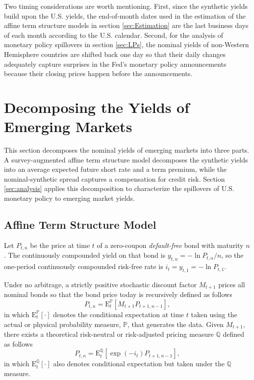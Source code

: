 \documentclass[a4paper, 12pt]{article}
\providecommand{\tnr}{n}
\providecommand{\idxt}{t}
\providecommand{\idxs}{\idxt,\tnr}
\providecommand{\yld}{y}
\providecommand{\yZero}{\yld_{\idxs}}
\providecommand{\Pzero}{P_{\idxs}}
\providecommand{\Pzerolag}{P_{\idxt+1,\tnr-1}}
\providecommand{\srate}{i}
\providecommand{\shortrate}{\srate_{\idxt}}
\providecommand{\SDF}{M_{\idxt+1}}
\providecommand{\Pmeasure}{\mathbb{P}}
\providecommand{\Qmeasure}{\mathbb{Q}}
\providecommand{\ExpP}{\mathrm{E}^{\Pmeasure}_{t}}
\providecommand{\ExpQ}{\mathrm{E}^{\Qmeasure}_{t}}
\newcommand{\PzeroP}{\Pzero = \ExpP \left[ \SDF \Pzerolag \right]}
\newcommand{\PzeroQ}{\Pzero = \ExpQ \left[ \exp\left(- \shortrate\right) \Pzerolag \right]}
\begin{document}
Two timing considerations are worth mentioning. First, since the synthetic yields build upon the U.S. yields, the end-of-month dates used in the estimation of the affine term structure models in section \ref{sec:Estimation} are the last business days of each month according to the U.S. calendar. Second, for the analysis of monetary policy spillovers in section \ref{sec:LPs}, the nominal yields of non-Western Hemisphere countries are shifted back one day so that their daily changes adequately capture surprises in the Fed's monetary policy announcements because their closing prices happen before the announcements. 


\section{Decomposing the Yields of Emerging Markets} \label{sec:Decomposition}
This section decomposes the nominal yields of emerging markets into three parts. A survey-augmented affine term structure model decomposes the synthetic yields into an average expected future short rate and a term premium, while the nominal-synthetic spread captures a compensation for credit risk. Section \ref{sec:analysis} applies this decomposition to characterize the spillovers of U.S. monetary policy to emerging market yields. 

\subsection{Affine Term Structure Model} \label{sec:YCmodel}
Let \(\Pzero\) be the price at time \(\idxt\) of a zero-coupon \textit{default-free} bond with maturity \(\tnr\). The continuously compounded yield on that bond is \(\yZero = - \ln \Pzero/\tnr\), so the one-period continuously compounded risk-free rate is \(\shortrate = \yld_{\idxt,1} = - \ln P_{t,1}\).

Under no arbitrage, a strictly positive stochastic discount factor \(\SDF\) prices all nominal bonds so that the bond price today is recursively defined as follows
\begin{equation} \label{eq:nPzeroP}
\PzeroP ,
\end{equation}
\noindent in which \(\ExpP [\cdot]\) denotes the conditional expectation at time \(\idxt\) taken using the actual or physical probability measure, \(\Pmeasure\), that generates the data. Given \(\SDF\), there exists a theoretical risk-neutral or risk-adjusted pricing measure \(\Qmeasure\) defined as follows 
\begin{equation} \label{eq:nPzeroQ}
\PzeroQ ,
\end{equation}
\noindent in which \(\ExpQ [\cdot]\) also denotes conditional expectation but taken under the \(\Qmeasure\)  measure. 
\end{document}
